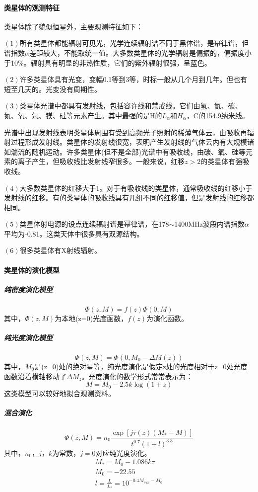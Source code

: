\paragraph{类星体的观测特征}类星体除了貌似恒星外，主要观测特征如下：

$\left(1\right)$所有类星体都能辐射可见光，光学连续辐射谱不同于黑体谱，是幂律谱，但谱指数$\alpha$差距较大，不能取统一值。大多数类星体的光学辐射是偏振的，偏振度小于10$\%$。辐射具有明显的非热性质，它们的紫外辐射很强，呈蓝色。

$\left(2\right)$许多类星体具有光变，变幅0.1等到3等，时标一般从几个月到几年。但也有短至几天的。光变没有周期性。

$\left(3\right)$类星体光谱中都具有发射线，包括容许线和禁戒线。它们由氢、氦、碳、氮、氧、氖、镁、硅等元素产生。其中最强的是H的$L_{\alpha}$和$H_{\alpha}$，C的154.9纳米线。

光谱中出现发射线表明类星体周围有受到高频光子照射的稀薄气体云，由吸收再辐射过程形成发射线。类星体的发射线很宽，表明产生发射线的气体云内有大规模诸如湍流的随机运动。许多类星体(但不是全部)光谱中有吸收线，由碳、氧、硅等元素的离子产生，但吸收线比发射线窄很多。一般来说，红移$z>2$的类星体有强吸收线。

$\left(4\right)$大多数类星体的红移大于1。对于有吸收线的类星体，通常吸收线的红移小于发射线的红移。有的类星体的吸收线具有几组不同的红移值，但是发射线的红移都相同。

$\left(5\right)$类星体射电源的设点连续辐射谱是幂律谱，在178$\sim$1400MHz波段内谱指数$\alpha$平均为-0.81。这类天体中很多具有双源结构。

$\left(6\right)$很多类星体有X射线辐射。

\paragraph{类星体的演化模型}
\subparagraph{纯密度演化模型}
\begin{equation}
	\varPhi(z,M)=f(z)\varPhi(0,M)
\end{equation}
其中，$\varPhi(z,M)$为本地(z=0)光度函数，$f(z)$为演化函数。
\subparagraph{纯光度演化模型}
\begin{equation}
	\varPhi(z,M)=\varPhi(0,M_{0}-\Delta M(z))
\end{equation}
其中，$M_{0}$是(z=0)处的绝对星等，纯光度演化是假定z处的光度相对于z=0处光度函数沿着横轴移动了$\Delta M_{z}$。光度演化的数学形式常常表示为：
\begin{equation}
	M=M_{0}-2.5k\log(1+z)
\end{equation}
这类模型可以较好地拟合观测资料。
\subparagraph{混合演化}
\begin{equation}
	\varPhi(z,M)=n_{0}\frac{\exp\left[j\tau(z)(M_{*}-M)\right]}{t^{0.7}(1+l)^{3.3}}
\end{equation}
其中，$n_{0}$，$j$，$k$为常数，$j=0$对应纯光度演化。
\begin{equation}
	\begin{aligned}
		M_{*}=M_{0}-1.086k\tau\\
		M_{0}=-22.55\\
		l=\frac{L}{L_{*}}=10^{-0.4M_{sun}-M_{0}}\\
	\end{aligned}
\end{equation}
